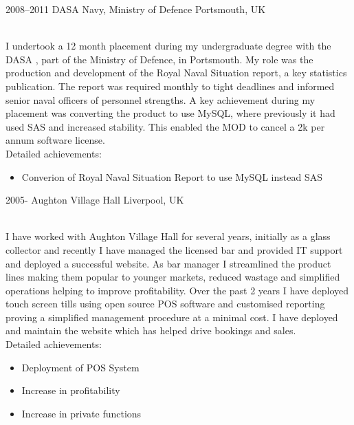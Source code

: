\documentclass[]{cv-style}          %
\begin{document}
\begin{entrylist}
\entry
  {2008--2011}
  {DASA Navy, Ministry of Defence}
  {Portsmouth, UK}
  {\\
  I undertook a 12 month placement during my undergraduate degree with the DASA , part of the Ministry of Defence, in Portsmouth. My role was the production and development of the Royal Naval Situation report, a key statistics publication. The report was required monthly to tight deadlines and informed senior naval officers of personnel strengths. A key achievement during my placement was converting the product to use MySQL, where previously it had used SAS and increased stability. This enabled the MOD to cancel a 2k per annum software license.\\
  Detailed achievements:
  \begin{itemize}
    \item Converion of Royal Naval Situation Report to use MySQL instead SAS
  \end{itemize}}
\entry
  {2005-}
  {Aughton Village Hall}
  {Liverpool, UK}
  {\\{I have worked with Aughton Village Hall for several years, initially as a glass collector and recently I have managed the licensed bar and provided IT support and deployed a successful website. As bar manager I streamlined the product lines making them popular to younger markets, reduced wastage and simplified operations helping to improve profitability. Over the past 2 years I have deployed touch screen tills using open source POS software and customised reporting proving a simplified management procedure at a minimal cost. I have deployed and maintain the website which has helped drive bookings and sales.\\}
    Detailed achievements:
  \begin{itemize}
    \item Deployment of POS System
    \item Increase in profitability
    \item Increase in private functions 
  \end{itemize}}

\end{entrylist}

\end{document}
